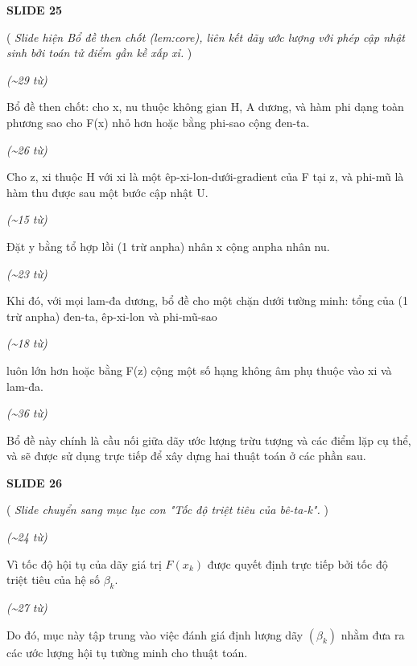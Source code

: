 ﻿\documentclass[12pt]{article}
\newcommand{\scene}[1]{
    \vspace{18pt}
    \normalsize
    \noindent\textbf{\MakeUppercase{#1}}
    \vspace{12pt}
}
\newcommand{\action}[1]{
    \vspace{6pt}
    \small
    \noindent(\textit{#1})
    \vspace{6pt}
}
\newenvironment{speech}{
    \normalsize
    \begin{list}{}{
        \leftmargin=1.25in
        \rightmargin=1.25in
        \parsep=0pt
        \topsep=0pt
        \partopsep=0pt
    }
    \item[]
}{
    \end{list}
    \vspace{6pt}
}
\newcommand{\block}[1]{
    \vspace{4pt}
    \noindent\hspace{1.5in}\textit{(\textasciitilde #1 từ)}
}
\begin{document}
\scene{SLIDE 25}

\action{
    Slide hiện Bổ đề then chốt (lem:core), liên kết dãy ước lượng với phép cập nhật sinh bởi toán tử điểm gần kề xấp xỉ.
}

\block{29}
\begin{speech}
    Bổ đề then chốt: cho x, nu thuộc không gian H, A dương, và hàm phi dạng toàn phương sao cho F(x) nhỏ hơn hoặc bằng phi-sao cộng đen-ta.
\end{speech}

\block{26}
\begin{speech}
    Cho z, xi thuộc H với xi là một êp-xi-lon-dưới-gradient của F tại z, và phi-mũ là hàm thu được sau một bước cập nhật U.
\end{speech}

\block{15}
\begin{speech}
    Đặt y bằng tổ hợp lồi (1 trừ anpha) nhân x cộng anpha nhân nu.
\end{speech}

\block{23}
\begin{speech}
    Khi đó, với mọi lam-đa dương, bổ đề cho một chặn dưới tường minh: tổng của (1 trừ anpha) đen-ta, êp-xi-lon và phi-mũ-sao
\end{speech}

\block{18}
\begin{speech}
    luôn lớn hơn hoặc bằng F(z) cộng một số hạng không âm phụ thuộc vào xi và lam-đa.
\end{speech}

\block{36}
\begin{speech}
    Bổ đề này chính là cầu nối giữa dãy ước lượng trừu tượng và các điểm lặp cụ thể, và sẽ được sử dụng trực tiếp để xây dựng hai thuật toán ở các phần sau.
\end{speech}

\scene{SLIDE 26}

\action{
    Slide chuyển sang mục lục con "Tốc độ triệt tiêu của bê-ta-k".
}

\block{24}
\begin{speech}
    Vì tốc độ hội tụ của dãy giá trị $F(x_k)$ được quyết định trực tiếp bởi tốc độ triệt tiêu của hệ số $\beta_k$.
\end{speech}

\block{27}
\begin{speech}
    Do đó, mục này tập trung vào việc đánh giá định lượng dãy $(\beta_k)$ nhằm đưa ra các ước lượng hội tụ tường minh cho thuật toán.
\end{speech}
\end{document}

